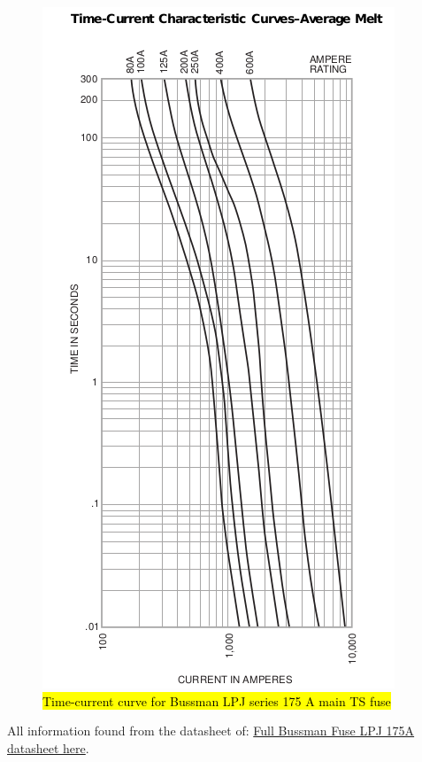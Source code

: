 \documentclass{article}
\DeclareRobustCommand{\hlr}[1]{{\sethlcolor{red}\hl{#1}}}
\begin{document}
\begin{figure}[H]
    \centering
    \includegraphics[width = 0.7 \textwidth]{TSfuseT-Agraph}
    \caption{\hlr{Time-current curve for Bussman LPJ series 175 A main TS fuse}}
    \label{mainTSfusecurve}
\end{figure}

All information found from the datasheet of:
\href{http://www.allfuses.com/media/documents/Bussmann\%20LPJ\%20(70-600A).pdf}{Full Bussman Fuse LPJ 175A datasheet here}.
\end{document}
